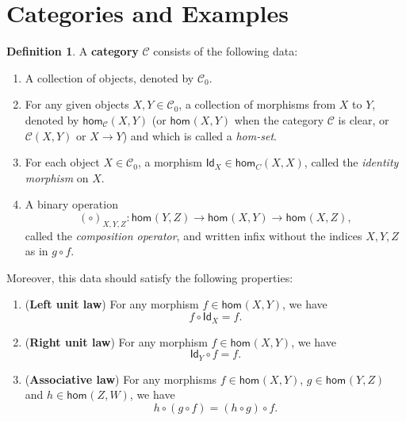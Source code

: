 \documentclass[a4paper,11pt, oneside,titlepage=false]{scrbook}
\theoremstyle{plain}
\theoremstyle{definition}
\newtheorem{dfn}[thm]{Definition}
\newcommand{\cfont}[1]{\ensuremath{\mathsf{#1}}}
\newcommand{\Cat}[1]{\mathcal{#1}}
\newcommand{\CC}{\Cat{C}}
\newcommand{\Ob}[1]{{#1}_0}
\newcommand{\Hom}[3][]{\cfont{hom}_{#1}(#2,#3)}
\newcommand{\CHom}[3]{{#1}(#2,#3)}
\newcommand{\Id}[1][]{\cfont{Id}_{#1}}
\newcommand{\co}[2]{\ensuremath{#2 \circ #1}}
\begin{document}
\section{Categories and Examples}

\begin{dfn}\label{dfn:category}
  A \textbf{category} $\CC$ consists of the following data:
\begin{enumerate}
\item A collection of objects, denoted by $\Ob{\CC}$.
\item For any given objects $X,Y \in \Ob{\CC}$, a collection of morphisms from $X$ to $Y$, denoted by $\Hom[\CC]{X}{Y}$ (or $\Hom{X}{Y}$ when the category $\CC$ is clear, or $\CHom \CC X Y$ or $X \to Y$) and which is called a \textit{hom-set}.
\item For each object $X\in \Ob{\CC}$, a morphism $\Id[X] \in \Hom[C]{X}{X}$, called the \textit{identity morphism} on $X$.
\item A binary operation
\[
(\co{}{})_{X,Y,Z} : \Hom{Y}{Z} \to \Hom X Y \to \Hom X Z,
\]
called the \textit{composition operator}, and written infix without the indices $X,Y,Z$ as in $\co{f}{g}$.
\end{enumerate}
Moreover, this data should satisfy the following properties:
\begin{enumerate}
\item (\textbf{Left unit law}) For any morphism $f \in \Hom X Y$, we have 
\[
 \co{\Id[X]} {f} = f.
\]
\item (\textbf{Right unit law}) For any morphism $f \in \Hom X Y$, we have 
\[
  \co f {\Id[Y]} = f.
\]
\item (\textbf{Associative law}) For any morphisms $f\in \Hom X Y$, $g\in \Hom Y Z$ and $h\in \Hom Z W$, we have
\[
     \co {(\co f g)}{h} =  \co f {(\co g  h)}.
\]
\end{enumerate}
\end{dfn}
\end{document}
